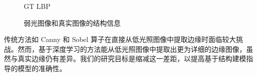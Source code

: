 \documentclass[CJK,aspectratio=169]{beamer}  %
\begin{document}
\begin{frame}
\begin{figure}
\begin{minipage}{.19\textwidth}
				\caption*{\tiny GT LBP}
				\label{fig: GT_lbp}	
			\end{minipage}
			\captionsetup{font=scriptsize}
			\caption{
				\label{fig: LLI Structure Information}
				弱光图像和真实图像的结构信息
			}
		\end{figure}
		
		\vspace{-0.5cm}
		
		{ \yahei 传统方法如 Canny 和 Sobel 算子\textcolor{blue}{\cite{maini2009study}}在直接从低光照图像中提取边缘时面临较大挑战。然而，基于深度学习的方法能从低光照图像中提取出更为详细的边缘图像，虽然与真实边缘仍有差异。我们的研究目标是缩减这一差距，以提高基于结构建模指导的模型的准确性。}
	\end{frame}
	
%		
%			
%			
%			
%		
\end{document}
